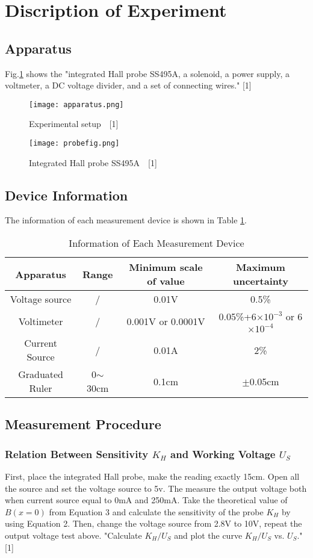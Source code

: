 \documentclass[12pt,a4paper]{article}
\begin{document}
\section{Discription of Experiment}
\subsection{Apparatus}
Fig.\ref{apparatus} shows the "integrated Hall probe SS495A, a solenoid, a power supply, a voltmeter, a DC voltage divider, and a set of connecting wires." [1]
\begin{figure}[H]
    \centering
    \texttt{[image: apparatus.png]}
    \caption{Experimental setup~~[1]}
    \label{apparatus}
\end{figure}

\begin{figure}[H]
    \centering
    \texttt{[image: probefig.png]}
    \caption{Integrated Hall probe SS495A~~[1]}
    \label{probefig}
\end{figure}

\subsection{Device Information}
The information of each measurement device is shown in Table \ref{information}.

\begin{table}[H]
    \centering
    \begin{tabular}{|c|c|c|c|}
    \hline
    Apparatus  & Range  & Minimum scale of   value & Maximum   uncertainty \\ \hline
    Voltage source  & / & 0.01V& 0.5\%  \\ \hline
    Voltimeter & / & 0.001V or 0.0001V & 0.05\%+6$\times 10^{-3}$ or 6$\times 10^{-4}$ \\ \hline
    Current Source  & / & 0.01A& 2\%  \\ \hline
    Graduated Ruler & 0$\sim$30cm & 0.1cm& $\pm$0.05cm  \\\hline
    \end{tabular}
    \caption{Information of Each Measurement Device}
    \label{information}
\end{table}

\subsection{Measurement Procedure}
\subsubsection{Relation Between Sensitivity $K_H$ and Working Voltage $U_S$}
First, place the integrated Hall probe, make the reading exactly 15cm. Open all the source and set the voltage source to 5v. The measure the output voltage both when current source equal to 0mA and 250mA. Take the theoretical value of $B(x = 0)$ from Equation 3 and calculate the sensitivity of the probe $K_H$ by using Equation 2. Then, change the voltage source from 2.8V to 10V, repeat the output voltage test above. "Calculate $K_H/U_S$ and plot the curve $K_H/U_S$ vs. $U_S$." [1]
\end{document}
